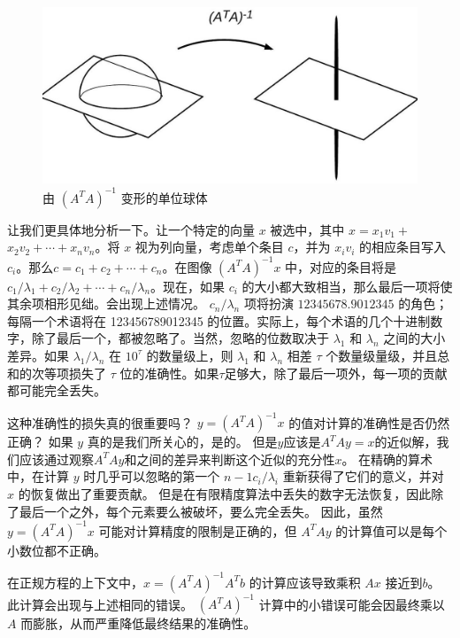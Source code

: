 \documentclass[11pt,a4paper,twoside]{article}
\begin{document}
\begin{CJK}{UTF8}{gbsn}
\begin{figure}[htbp]%
  \centering
  \includegraphics[totalheight=2in]{./fig/5.jpg}
  \caption{由 $\left(A^{T} A\right)^{-1}$ 变形的单位球体} 
  \label{fig:5}
\end{figure}

让我们更具体地分析一下。让一个特定的向量 $x$ 被选中，其中 $x=x_{1} v_{1}+$ $x_{2} v_{2}+\cdots+x_{n} v_{n}$。将 $x$ 视为列向量，考虑单个条目 $c$，并为 $x_{i} v_{i}$ 的相应条目写入 $c_{i}$。那么$c=c_{1}+c_{2}+\cdots+c_{n}$。在图像 $\left(A^{T} A\right)^{-1} x$ 中，对应的条目将是 $c_{1} / \lambda_{1}+c_{2} / \lambda_{2} +\cdots+c_{n} / \lambda_{n}$。现在，如果 $c_{i}$ 的大小都大致相当，那么最后一项将使其余项相形见绌。会出现上述情况。 $c_{n} / \lambda_{n}$ 项将扮演 $12345678.9012345$ 的角色；每隔一个术语将在 123456789012345 的位置。实际上，每个术语的几个十进制数字，除了最后一个，都被忽略了。当然，忽略的位数取决于 $\lambda_{1}$ 和 $\lambda_{n}$ 之间的大小差异。如果 $\lambda_{1} / \lambda_{n}$ 在 $10^{\tau}$ 的数量级上，则 $\lambda_{1}$ 和 $\lambda_{n}$ 相差 $\tau$ 个数量级量级，并且总和的次等项损失了 $\tau$ 位的准确性。如果$\tau$足够大，除了最后一项外，每一项的贡献都可能完全丢失。

这种准确性的损失真的很重要吗？ $y=\left(A^{T} A\right)^{-1} x$ 的值对计算的准确性是否仍然正确？ 如果 $y$ 真的是我们所关心的，是的。 但是$y$应该是$A^{T} A y=x$的近似解，我们应该通过观察$A^{T} A y$和$之间的差异来判断这个近似的充分性 x$。 在精确的算术中，在计算 $y$ 时几乎可以忽略的第一个 $n-1 c_{i} / \lambda_{i}$ 重新获得了它们的意义，并对 $x$ 的恢复做出了重要贡献。 但是在有限精度算法中丢失的数字无法恢复，因此除了最后一个之外，每个元素要么被破坏，要么完全丢失。 因此，虽然 $y=\left(A^{T} A\right)^{-1} x$ 可能对计算精度的限制是正确的，但 $A^{T} A y$ 的计算值可以是每个小数位都不正确。

在正规方程的上下文中，$x=\left(A^{T} A\right)^{-1} A^{T} b$ 的计算应该导致乘积 $A x$ 接近到$b$。 此计算会出现与上述相同的错误。 $\left(A^{T} A\right)^{-1}$ 计算中的小错误可能会因最终乘以 $A$ 而膨胀，从而严重降低最终结果的准确性。


\end{CJK}
\end{document}
